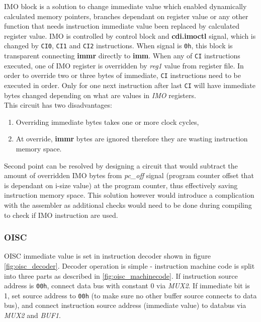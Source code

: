 IMO block is a solution to change immediate value which enabled dynamically calculated memory pointers, branches dependant on register value or any other function that needs instruction immediate value been replaced by calculated register value. IMO is controlled by control block and \textbf{cdi.imoctl} signal, which is changed by \texttt{CI0}, \texttt{CI1} and \texttt{CI2} instructions. When signal is \texttt{0h}, this block is transparent connecting \textbf{immr} directly to \textbf{imm}. When any of \texttt{CI} instructions executed, one of IMO register is overridden by \textit{reg1} value from register file. In order to override two or three bytes of immediate, \texttt{CI} instructions need to be executed in order. Only for one next instruction after last \texttt{CI} will have immediate bytes changed depending on what are values in \textit{IMO} registers.
\\This circuit has two disadvantages: 
\begin{enumerate}
	\item Overriding immediate bytes takes one or more clock cycles,
	\item At override, \textbf{immr} bytes are ignored therefore they are wasting instruction memory space.
\end{enumerate}
Second point can be resolved by designing a circuit that would subtract the amount of overridden IMO bytes from \textit{pc\_off} signal (program counter offset that is dependant on i-size value) at the program counter, thus effectively saving instruction memory space. This solution however would introduce a complication with the assembler as additional checks would need to be done during compiling to check if IMO instruction are used.

\subsubsection{OISC}
OISC immediate value is set in instruction decoder shown in figure \ref{fig:oisc_decoder}. Decoder operation is simple - instruction machine code is split into three parts as described in \ref{fig:oisc_machinecode}. If instruction source address is \texttt{00h}, connect data bus with constant 0 via \textit{MUX2}. If immediate bit is 1, set source address to \texttt{00h} (to make sure no other buffer source connects to data bus), and connect instruction source address (immediate value) to databus via \textit{MUX2} and \textit{BUF1}. 

